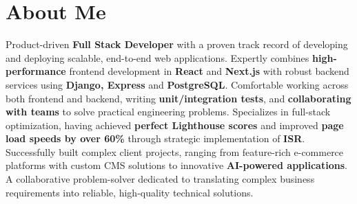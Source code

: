 \section{About Me}

Product-driven \textbf{Full Stack Developer} with a proven track record of developing and deploying scalable, end-to-end web applications. Expertly combines \textbf{high-performance} frontend development in \textbf{React} and \textbf{Next.js} with robust backend services using \textbf{Django, Express} and \textbf{PostgreSQL}. Comfortable working across both frontend and backend, writing \textbf{unit/integration tests}, and \textbf{collaborating with teams} to solve practical engineering problems. Specializes in full-stack optimization, having achieved \textbf{perfect Lighthouse scores} and improved \textbf{page load speeds by over 60\%} through strategic implementation of \textbf{ISR}. Successfully built complex client projects, ranging from feature-rich e-commerce platforms with custom CMS solutions to innovative \textbf{AI-powered applications}. A collaborative problem-solver dedicated to translating complex business requirements into reliable, high-quality technical solutions.
